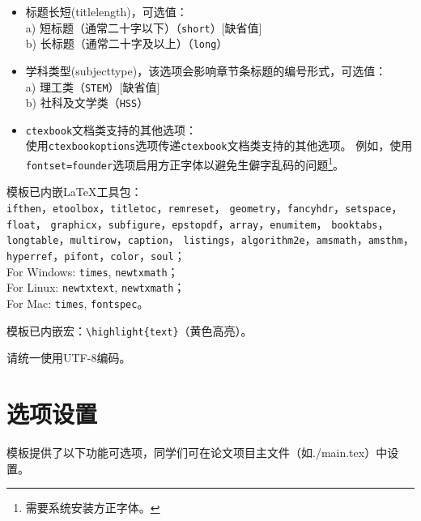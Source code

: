 \begin{itemize}[leftmargin=3cm]
    a) Windows（\verb|win|）[缺省值]\\
    b) Linux（\verb|linux|）\\
    c) Mac（\verb|mac|）
  \item[{\tt titlelength} $\triangleright$] 标题长短(titlelength)，可选值： \\
    a) 短标题（通常二十字以下）（\verb|short|）[缺省值]\\
    b) 长标题（通常二十字及以上）（\verb|long|）
  \item[{\tt subjecttype} $\triangleright$] 学科类型(subjecttype)，该选项会影响章节条标题的编号形式，可选值： \\
  	a) 理工类（\verb|STEM|）[缺省值]\\
	b) 社科及文学类（\verb|HSS|）  
  \item[{\tt ctexbookoptions} $\triangleright$] {\tt ctexbook}文档类支持的其他选项： \\
    使用{\tt ctexbookoptions}选项传递{\tt ctexbook}文档类支持的其他选项。
    例如，使用{\tt fontset=founder}选项启用方正字体以避免生僻字乱码的问题\footnote{需要系统安装方正字体。}。
\end{itemize}


\setlength{\hangindent}{4em}
模板已内嵌LaTeX工具包：\\
{\tt ifthen}，{\tt etoolbox}，{\tt titletoc}，{\tt remreset}，
{\tt geometry}，{\tt fancyhdr}，{\tt setspace}，{\tt float}，
{\tt graphicx}，{\tt subfigure}，{\tt epstopdf}，{\tt array}，{\tt enumitem}，
{\tt booktabs}，{\tt longtable}，{\tt multirow}，{\tt caption}，
{\tt listings}，{\tt algorithm2e}，{\tt amsmath}，{\tt amsthm}，
{\tt hyperref}，{\tt pifont}，{\tt color}，{\tt soul}；\\
For Windows: {\tt times}, {\tt newtxmath}；\\
For Linux: {\tt newtxtext}, {\tt newtxmath}；\\
For Mac: {\tt times}, {\tt fontspec}。


模板已内嵌宏：\verb|\highlight{text}|（黄色高亮）。

请统一使用UTF-8编码。



\section{选项设置}

模板提供了以下功能可选项，同学们可在论文项目主文件（如./main.tex）中设置。

